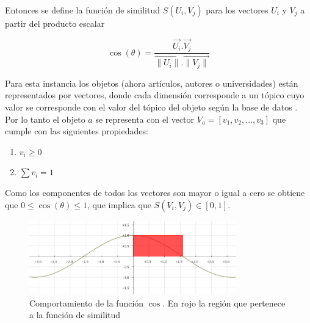 Entonces se define la función de similitud $S(U_i, V_j)$ para los vectores $U_i$ y $V_j$ a partir del producto escalar

\begin{equation} \label{eq:angulovectorial}
\cos(\theta) =  \dfrac{\overrightarrow{U_i} . \overrightarrow{V_j}}{\overrightarrow{\lVert U_i\lVert}.\overrightarrow{\lVert V_j\lVert}}
\end{equation}

Para esta instancia los objetos (ahora artículos, autores o universidades) están representados por vectores, donde cada dimensión corresponde a un tópico cuyo valor se corresponde con el valor del tópico del objeto según la base de datos \cite{dataDrive}. Por lo tanto el objeto $a$ se representa con el vector $V_a = [v_1,v_2,...,v_3]$ que cumple con las siguientes propiedades:
\begin{enumerate}
 \item $v_i \geq 0$
 \item $\sum{v_i} = 1$
\end{enumerate}

Como los componentes de todos los vectores son mayor o igual a cero se obtiene que $0\leq\cos(\theta)\leq1$, que implica que $S(V_i, V_j) \in \left[0, 1\right]$.

\begin{figure}[H]
\includegraphics[width=0.8\textwidth]{img/coseno.png}
\caption{Comportamiento de la función $\cos$. En rojo la región que pertenece a la función de similitud}
\label{bus:img-coseno}
\end{figure}


